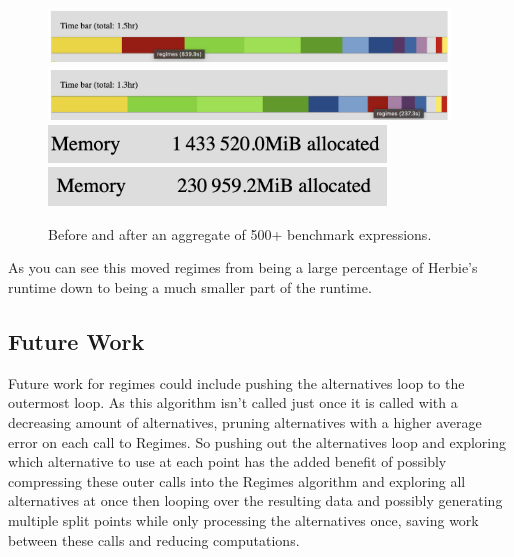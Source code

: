 \documentclass{article}
\begin{document}
\begin{figure}[htbp]
\begin{center}
\includegraphics[width=0.95\textwidth]{regimes-before.png}
\includegraphics[width=0.95\textwidth]{regimes-after.png}
\includegraphics[width=0.80\textwidth]{memory-before.png}
\includegraphics[width=0.80\textwidth]{memory-after.png}
\caption{Before and after an aggregate of 500+ benchmark expressions.}
\label{fig:before-after} 
\end{center}
\end{figure}

As you can see this moved regimes from being a large percentage of Herbie’s runtime down to being a much smaller part of the runtime. 


\subsection{Future Work}
Future work for regimes could include pushing the alternatives loop to the outermost loop. As this algorithm isn’t called just once it is called with a decreasing amount of alternatives, pruning alternatives with a higher average error on each call to Regimes. So pushing out the alternatives loop and exploring which alternative to use at each point has the added benefit of possibly compressing these outer calls into the Regimes algorithm and exploring all alternatives at once then looping over the resulting data and possibly generating multiple split points while only processing the alternatives once, saving work between these calls and reducing computations.
\end{document}
